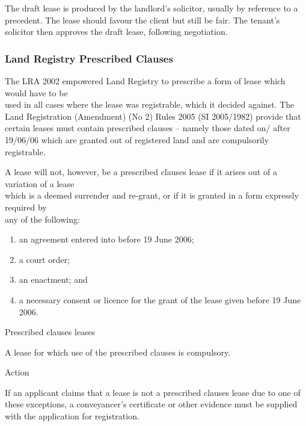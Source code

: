 \documentclass[
]{article}
\providecommand{\tightlist}{%
  \setlength{\itemsep}{0pt}\setlength{\parskip}{0pt}}
\newenvironment{env-da05fb3b-c564-4905-b729-fa3c9eadbf7c}
{
    \savenotes\tcolorbox[blanker,breakable,left=5pt,borderline west={2pt}{-4pt}{aquamarine}]
}
{
    \endtcolorbox\spewnotes
}
\newenvironment{env-ab392b14-a05f-4d9a-80eb-a63d00eb59ea}
{
    \savenotes\tcolorbox[blanker,breakable,left=5pt,borderline west={2pt}{-4pt}{gold}]
}
{
    \endtcolorbox\spewnotes
}
\begin{document}
The draft lease is produced by the landlord's solicitor, usually by
reference to a precedent. The lease should favour the client but still
be fair. The tenant's solicitor then approves the draft lease, following
negotiation.

\hypertarget{land-registry-prescribed-clauses}{%
\subsubsection{Land Registry Prescribed
Clauses}\label{land-registry-prescribed-clauses}}

The LRA 2002 empowered Land Registry to prescribe a form of lease which
would have to be\\
used in all cases where the lease was registrable, which it decided
against. The Land Registration (Amendment) (No 2) Rules 2005 (SI
2005/1982) provide that certain leases must contain prescribed clauses
-- namely those dated on/ after 19/06/06 which are granted out of
registered land and are compulsorily registrable.

A lease will not, however, be a prescribed clauses lease if it arises
out of a variation of a lease\\
which is a deemed surrender and re-grant, or if it is granted in a form
expressly required by\\
any of the following:

\begin{enumerate}
\tightlist
\item
  an agreement entered into before 19 June 2006;
\item
  a court order;
\item
  an enactment; and
\item
  a necessary consent or licence for the grant of the lease given before
  19 June 2006.
\end{enumerate}

\begin{env-ab392b14-a05f-4d9a-80eb-a63d00eb59ea}

Prescribed clauses leases

A lease for which use of the prescribed clauses is compulsory.

\end{env-ab392b14-a05f-4d9a-80eb-a63d00eb59ea}

\begin{env-da05fb3b-c564-4905-b729-fa3c9eadbf7c}

Action

If an applicant claims that a lease is not a prescribed clauses lease
due to one of these exceptions, a conveyancer's certificate or other
evidence must be supplied with the application for registration.

\end{env-da05fb3b-c564-4905-b729-fa3c9eadbf7c}
\end{document}
